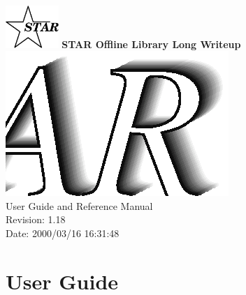\documentclass[twoside]{article}
\begin{document}
%
%
\begin{titlepage}
\pagestyle{empty}
\vspace*{-35mm}
\begin{center}
  \mbox{\includegraphics[width=2cm]{StarIcon.eps}}
  {\Large\bf STAR Offline Library Long Writeup}
  \hfill\mbox{}\\[3cm]
  \mbox{\includegraphics[width=\textwidth]{StarClassLibraryTitle.eps}}
  \hfill\mbox{}\\[3cm]
  {\LARGE User Guide and Reference Manual}\\[2cm]
  {\LARGE $ $Revision: 1.18 $ $}  \\[5mm] %
  {\LARGE $ $Date: 2000/03/16 16:31:48 $ $}  %
  \vfill
\end{center}
\cleardoublepage
\end{titlepage}

%
%
\tableofcontents
\cleardoublepage

%
%
\part{User Guide}
\clearpage
\end{document}
